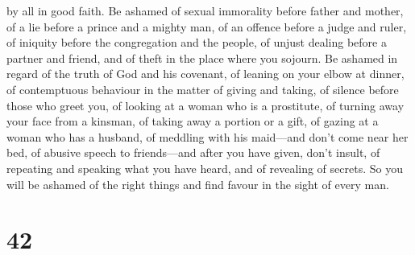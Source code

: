 by all in good faith.  Be ashamed of sexual immorality
before father and mother, of a lie before a prince and a mighty man,
 of an offence before a judge and ruler, of iniquity before
the congregation and the people, of unjust dealing before a partner and
friend,  and of theft in the place where you sojourn. Be
ashamed in regard of the truth of God and his covenant, of leaning on
your elbow at dinner, of contemptuous behaviour in the matter of giving
and taking,  of silence before those who greet you, of
looking at a woman who is a prostitute,  of turning away
your face from a kinsman, of taking away a portion or a gift, of gazing
at a woman who has a husband,  of meddling with his
maid---and don't come near her bed, of abusive speech to friends---and
after you have given, don't insult,  of repeating and
speaking what you have heard, and of revealing of secrets. 
So you will be ashamed of the right things and find favour in the sight
of every man.

\hypertarget{section-31}{%
\section{42}\label{section-31}}

